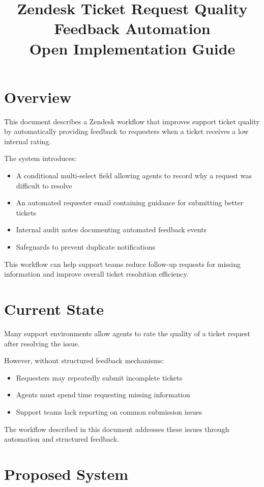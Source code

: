 \documentclass[11pt]{article}
\title{\textbf{Zendesk Ticket Request Quality Feedback Automation}\\
\vspace{4pt}
\large Open Implementation Guide}
\date{}
\author{}
\begin{document}
\maketitle

\section{Overview}

This document describes a Zendesk workflow that improves support ticket quality by automatically providing feedback to requesters when a ticket receives a low internal rating.

The system introduces:

\begin{itemize}
\item A conditional multi-select field allowing agents to record why a request was difficult to resolve
\item An automated requester email containing guidance for submitting better tickets
\item Internal audit notes documenting automated feedback events
\item Safeguards to prevent duplicate notifications
\end{itemize}

This workflow can help support teams reduce follow-up requests for missing information and improve overall ticket resolution efficiency.

\section{Current State}

Many support environments allow agents to rate the quality of a ticket request after resolving the issue.

However, without structured feedback mechanisms:

\begin{itemize}
\item Requesters may repeatedly submit incomplete tickets
\item Agents must spend time requesting missing information
\item Support teams lack reporting on common submission issues
\end{itemize}

The workflow described in this document addresses these issues through automation and structured feedback.

\section{Proposed System}
\end{document}
